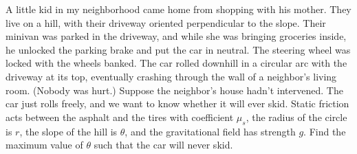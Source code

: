 A little kid in my neighborhood came home from shopping
with his mother. They live on a hill, with their driveway oriented
perpendicular to the slope. Their minivan was parked in the driveway, and
while she was bringing groceries inside, he unlocked the
parking brake and put the car in neutral. The steering wheel was locked with the
wheels banked.
The car rolled downhill in a circular arc with the driveway
at its top, eventually crashing through the
wall of a neighbor's living room. (Nobody was hurt.) Suppose the neighbor's house hadn't intervened.
The car just rolls freely, and we want to know whether it will
ever skid. Static friction acts between the asphalt and the tires with coefficient
$\mu_s$, the radius of the circle is $r$, the slope of the hill is $\theta$,
and the gravitational field has strength $g$. Find the maximum value of $\theta$
such that the car will never skid.
\answercheck
